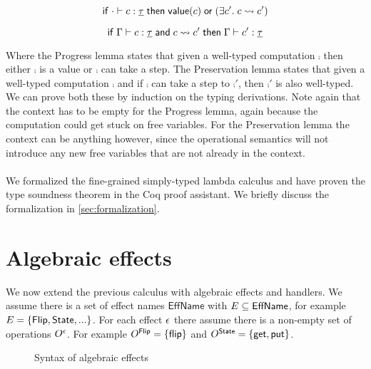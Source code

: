 {\begin{lemma}[Progress]
\[
	\mathsf{if}\;
		\cdot \vdash c : \underline{\tau}
	\;\mathsf{then}\;
		\mathsf{value}(c)
		\;\mathsf{or}\;
		(\exists c'.\; c \rightsquigarrow c')
\]
\end{lemma}

\begin{lemma}[Preservation]
\[
	\mathsf{if}\;
		\Gamma \vdash c : \underline{\tau}
		\;\mathsf{and}\;
		c \rightsquigarrow c'
	\;\mathsf{then}\;
		\Gamma \vdash c' : \underline{\tau}
\]
\end{lemma}

Where the Progress lemma states that given a well-typed computation $\comp$ then either $\comp$ is a value or $\comp$ can take a  step.
The Preservation lemma states that given a well-typed computation $\comp$ and if $\comp$ can take a step to $\comp'$, then $\comp'$ is also well-typed.
We can prove both these by induction on the typing derivations.
Note again that the context has to be empty for the Progress lemma, again because the computation could get stuck on free variables.
For the Preservation lemma the context can be anything however, since the operational semantics will not introduce any new free variables that are not already in the context.
\\\\
We formalized the fine-grained simply-typed lambda calculus and have proven the type soundness theorem in the Coq proof assistant.
We briefly discuss the formalization in \cref{sec:formalization}.

\section{Algebraic effects} \label{sec:theory-algeff}

We now extend the previous calculus with algebraic effects and handlers.
We assume there is a set of effect names $\mathsf{EffName}$ with $E \subseteq \mathsf{EffName}$, for example $E = \{ \mathsf{Flip}, \mathsf{State}, ... \}$. For each effect $\epsilon$ there assume there is a non-empty set of operations $O^{\epsilon}$.
For example $O^{\mathsf{Flip}} = \{ \mathsf{flip} \}$ and $O^{\mathsf{State}} = \{ \mathsf{get}, \mathsf{put} \}$.

\begin{figure}[H]
\caption{Syntax of algebraic effects}
\centering
{}
\end{figure}

}
